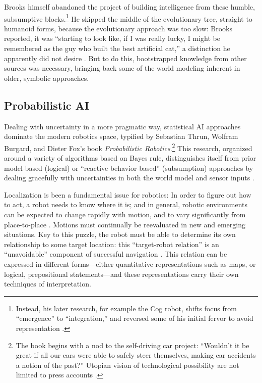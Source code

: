 Brooks himself abandoned the project of building intelligence from
these humble, subsumptive blocks.\footnote{Instead, his later research, for example
the Cog robot, shifts focus from ``emergence'' to ``integration,'' and
reversed some of his initial fervor to avoid representation \cite[p.
  258]{ekbia}.} He skipped the middle of the evolutionary tree, straight
to humanoid forms, because the evolutionary approach was too slow: 
Brooks reported, it was ``starting to look like, if I was really
lucky, I might be remembered as the guy who built the best artificial
cat,'' a distinction he apparently did not desire \cite[p.
  65]{brooksflesh}. But to do this, bootstrapped knowledge from other sources was
necessary, bringing back some of the world modeling inherent in older,
symbolic approaches. 

\subsection{Probabilistic AI}

Dealing with uncertainty in a more pragmatic way, statistical AI
approaches dominate the modern robotics space, typified by Sebastian 
Thrun, Wolfram Burgard, and Dieter Fox's book
\emph{Probabilistic Robotics}.\footnote{The book begins with a nod to
  the self-driving car project: ``Wouldn't it be great if all our cars
were able to safely steer themselves, making car accidents a notion of
the past?'' Utopian vision of technological possibility are not
limited to press accounts \cite[p. 3]{thrunProb}.} This research,
organized around a variety of algorithms based on Bayes rule,
distinguishes itself from prior model-based (logical) or ``reactive
behavior-based'' (subsumption) approaches by dealing gracefully with
uncertainties in both the world model and sensor inputs \cite[p.
  9]{thrunProb}. 


Localization is been a fundamental issue for robotics: In order to figure out how to act, a robot
needs to know where it is; and in general, robotic environments can be
expected to change rapidly with motion, and to vary significantly from
place-to-place \cite[p. 4]{SLAMbook}. Motions must continually be reevaluated in new and
emerging situations. Key to this puzzle, the robot must be able to determine its own
relationship to some target location: this
``target-robot relation'' is an ``unavoidable'' component of successful
navigation \cite[p. 5]{SLAMbook}. This relation can be expressed
in different forms---either quantitative representations such as maps,
or logical, prepositional statements---and these representations carry
their own techniques of interpretation. 

